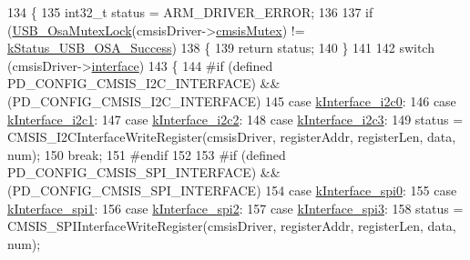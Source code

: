 \begin{DoxyCode}
134 \{
135     int32\_t status = ARM\_DRIVER\_ERROR;
136 
137     \textcolor{keywordflow}{if} (\hyperlink{group__usb__os__abstraction_ga1fed31c4b683c5f652b4e2e8b23c34fd}{USB\_OsaMutexLock}(cmsisDriver->\hyperlink{struct__cmsis__drier__adapter_a952d05d8262ef9aebfa6ca9c4d62fe46}{cmsisMutex}) != 
      \hyperlink{group__usb__os__abstraction_gga453ebd2f93aafb8c938c3a23c815f9bdab90805fb75297fda1ca60dbb2283f933}{kStatus\_USB\_OSA\_Success})
138     \{
139         \textcolor{keywordflow}{return} status;
140     \}
141 
142     \textcolor{keywordflow}{switch} (cmsisDriver->\hyperlink{struct__cmsis__drier__adapter_a51a572fa7a648387cf481b45b862457c}{interface})
143     \{
144 \textcolor{preprocessor}{#if (defined PD\_CONFIG\_CMSIS\_I2C\_INTERFACE) && (PD\_CONFIG\_CMSIS\_I2C\_INTERFACE)
}
145 \textcolor{preprocessor}{}        \textcolor{keywordflow}{case} \hyperlink{group__usb__pd__stack_gga4aed694f998da91dea8d218596d65c1ea0e6fc11f3fbc9732619f2083042e7e17}{kInterface\_i2c0}:
146         \textcolor{keywordflow}{case} \hyperlink{group__usb__pd__stack_gga4aed694f998da91dea8d218596d65c1eaf78fb0f4bdd4db6e8a2e5dab05ba59d2}{kInterface\_i2c1}:
147         \textcolor{keywordflow}{case} \hyperlink{group__usb__pd__stack_gga4aed694f998da91dea8d218596d65c1ea7e08032b6509673dc643a7d01a5baec4}{kInterface\_i2c2}:
148         \textcolor{keywordflow}{case} \hyperlink{group__usb__pd__stack_gga4aed694f998da91dea8d218596d65c1ea369545de00e8d0fb91e9f065d725c16c}{kInterface\_i2c3}:
149             status = CMSIS\_I2CInterfaceWriteRegister(cmsisDriver, registerAddr, registerLen, data, num);
150             \textcolor{keywordflow}{break};
151 \textcolor{preprocessor}{#endif
}
152 \textcolor{preprocessor}{}
153 \textcolor{preprocessor}{#if (defined PD\_CONFIG\_CMSIS\_SPI\_INTERFACE) && (PD\_CONFIG\_CMSIS\_SPI\_INTERFACE)
}
154 \textcolor{preprocessor}{}        \textcolor{keywordflow}{case} \hyperlink{group__usb__pd__stack_gga4aed694f998da91dea8d218596d65c1ea48b48a50986d3b6fd9e7640cbea852ef}{kInterface\_spi0}:
155         \textcolor{keywordflow}{case} \hyperlink{group__usb__pd__stack_gga4aed694f998da91dea8d218596d65c1ea178b943373d02f27c53232f7e31e62a6}{kInterface\_spi1}:
156         \textcolor{keywordflow}{case} \hyperlink{group__usb__pd__stack_gga4aed694f998da91dea8d218596d65c1ea1a8206ebb4a5aa81b0401b26d239ad9d}{kInterface\_spi2}:
157         \textcolor{keywordflow}{case} \hyperlink{group__usb__pd__stack_gga4aed694f998da91dea8d218596d65c1ea0842cd2e8c57954daf912b6d7b648e9f}{kInterface\_spi3}:
158             status = CMSIS\_SPIInterfaceWriteRegister(cmsisDriver, registerAddr, registerLen, data, num);

\end{DoxyCode}
